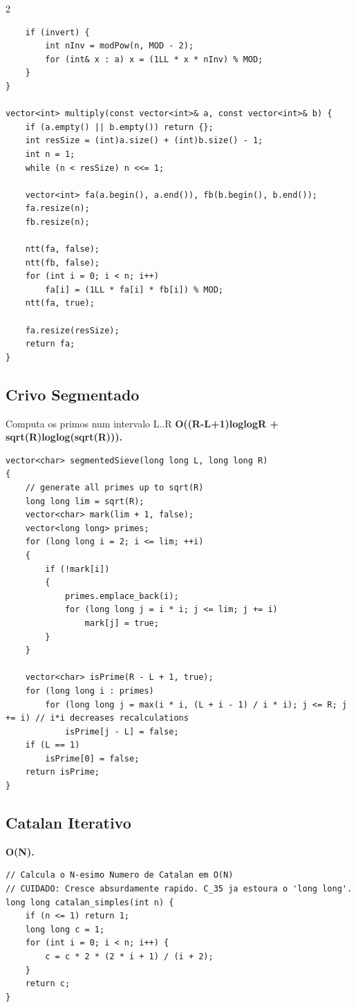 \documentclass[11pt]{article}
\begin{document}
\begin{multicols}{2}
\begin{lstlisting}
    if (invert) {
        int nInv = modPow(n, MOD - 2);
        for (int& x : a) x = (1LL * x * nInv) % MOD;
    }
}

vector<int> multiply(const vector<int>& a, const vector<int>& b) {
    if (a.empty() || b.empty()) return {};
    int resSize = (int)a.size() + (int)b.size() - 1;
    int n = 1;
    while (n < resSize) n <<= 1;

    vector<int> fa(a.begin(), a.end()), fb(b.begin(), b.end());
    fa.resize(n);
    fb.resize(n);

    ntt(fa, false);
    ntt(fb, false);
    for (int i = 0; i < n; i++)
        fa[i] = (1LL * fa[i] * fb[i]) % MOD;
    ntt(fa, true);

    fa.resize(resSize);
    return fa;
}
\end{lstlisting}

\subsection{Crivo Segmentado}
Computa os primos num intervalo L..R \textbf{O((R-L+1)loglogR + sqrt(R)loglog(sqrt(R))).}
\begin{lstlisting}
vector<char> segmentedSieve(long long L, long long R)
{
    // generate all primes up to sqrt(R)
    long long lim = sqrt(R);
    vector<char> mark(lim + 1, false);
    vector<long long> primes;
    for (long long i = 2; i <= lim; ++i)
    {
        if (!mark[i])
        {
            primes.emplace_back(i);
            for (long long j = i * i; j <= lim; j += i)
                mark[j] = true;
        }
    }

    vector<char> isPrime(R - L + 1, true);
    for (long long i : primes)
        for (long long j = max(i * i, (L + i - 1) / i * i); j <= R; j += i) // i*i decreases recalculations
            isPrime[j - L] = false;
    if (L == 1)
        isPrime[0] = false;
    return isPrime;
}
\end{lstlisting}

\subsection{Catalan Iterativo}
\textbf{O(N).}
\begin{lstlisting}
// Calcula o N-esimo Numero de Catalan em O(N)
// CUIDADO: Cresce absurdamente rapido. C_35 ja estoura o 'long long'.
long long catalan_simples(int n) {
    if (n <= 1) return 1;
    long long c = 1;
    for (int i = 0; i < n; i++) {
        c = c * 2 * (2 * i + 1) / (i + 2);
    }
    return c;
}
\end{lstlisting}


\end{multicols}
\end{document}
